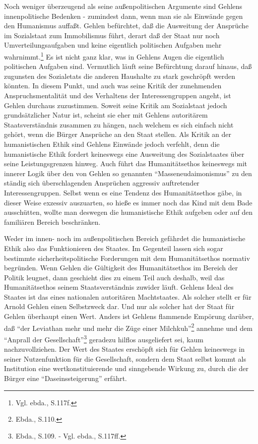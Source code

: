 \documentclass[12pt,a4paper]{article}
\begin{document}
Noch weniger überzeugend als seine außenpolitischen Argumente sind Gehlens
innenpolitische Bedenken - zumindest dann, wenn man sie als Einwände gegen
den Humanismus auffaßt. Gehlen befürchtet, daß die Ausweitung der
Ansprüche im Sozialstaat zum Immobilismus führt, derart daß der Staat nur
noch Umverteilungsaufgaben und keine eigentlich politischen Aufgaben mehr
wahrnimmt.\footnote{Vgl. ebda., S.117f.} Es ist nicht ganz klar, was in
Gehlens Augen die eigentlich politischen Aufgaben sind. Vermutlich läuft
seine Befürchtung darauf hinaus, daß zugunsten des Sozialetats die anderen
Haushalte zu stark geschröpft werden könnten. In diesem Punkt, und auch was
seine Kritik der zunehmenden Anspruchsmentalität und des Verhaltens der
Interessengruppen angeht, ist Gehlen durchaus zuzustimmen. Soweit seine
Kritik am Sozialstaat jedoch grundsätzlicher Natur ist, scheint sie eher mit
Gehlens autoritärem Staatsverständnis zusammen zu hängen, nach welchem es
sich einfach nicht gehört, wenn die Bürger Ansprüche an den Staat stellen.
Als Kritik an der humanistischen Ethik sind Gehlens Einwände jedoch
verfehlt, denn die humanistische Ethik fordert keineswegs eine Ausweitung des
Sozialstaates über seine Leistungsgrenzen hinweg. Auch führt das
Humanitätsethos keineswegs mit innerer Logik über den von Gehlen so
genannten "`Masseneudaimonismus"' zu den ständig sich überschlagenden
Ansprüchen aggressiv auftretender Interessengruppen. Selbst wenn es eine
Tendenz des Humanitätsethos gäbe, in dieser Weise exzessiv auszuarten, so
hieße es immer noch das Kind mit dem Bade ausschütten, wollte man deswegen
die humanistische Ethik aufgeben oder auf den familiären Bereich
beschränken.

Weder im innen- noch im außenpolitischen Bereich gefährdet die humanistische
Ethik also das Funktionieren des Staates. Im Gegenteil lassen sich sogar
bestimmte sicherheitspolitische Forderungen mit dem Humanitätsethos normativ
begründen. Wenn Gehlen die Gültigkeit des Humanitätsethos im Bereich der
Politik leugnet, dann geschieht dies zu einem Teil auch deshalb, weil das
Humanitätsethos seinem Staatsverständnis zuwider läuft. Gehlens Ideal des
Staates ist das eines nationalen autoritären Machtstaates. Als solcher stellt
er für Arnold Gehlen einen Selbstzweck dar. Und nur als solcher hat der Staat
für Gehlen überhaupt einen Wert. Anders ist Gehlens flammende Empörung
darüber, daß "`der Leviathan mehr und mehr die Züge einer
Milchkuh"'\footnote{Ebda., S.110.} annehme und dem "`Anprall der
Gesellschaft"'\footnote{Ebda., S.109. - Vgl. ebda., S.117ff.}  geradezu
hilflos ausgeliefert sei, kaum nachzuvollziehen. Der Wert des Staates
erschöpft sich für Gehlen keineswegs in seiner Nutzenfunktion für die
Gesellschaft, sondern dem Staat selbst kommt als Institution eine
wertkonstituierende und sinngebende Wirkung zu, durch die der Bürger eine
"`Daseinssteigerung"' erfährt.
\end{document}
